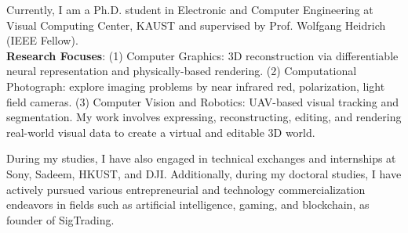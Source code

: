 

\begin{cvparagraph}
Currently, I am a Ph.D. student in Electronic and Computer Engineering at Visual Computing Center, KAUST and supervised by Prof. Wolfgang Heidrich (IEEE Fellow). \\
\textbf{Research Focuses}: (1) Computer Graphics: 3D reconstruction via differentiable neural representation and physically-based rendering. (2) Computational Photograph: explore imaging problems by near infrared red, polarization, light field  cameras. (3) Computer Vision and Robotics: UAV-based visual tracking and segmentation. My work involves expressing, reconstructing, editing, and rendering real-world visual data to create a virtual and editable 3D world.

During my studies, I have also engaged in technical exchanges and internships at Sony, Sadeem, HKUST, and DJI. Additionally, during my doctoral studies, I have actively pursued various entrepreneurial and technology commercialization endeavors in fields such as artificial intelligence, gaming, and blockchain, as founder of SigTrading.
\end{cvparagraph}

